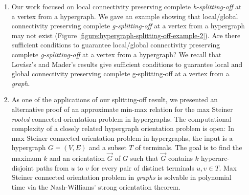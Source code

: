 \begin{enumerate}
    \item Our work focused on local connectivity preserving complete \emph{h-splitting-off} at a vertex from a hypergraph. We gave an example showing that local/global connectivity preserving complete \emph{g-splitting-off} at a vertex from a hypergraph may not exist (Figure \ref{figure:hypergraph-splitting-off-example-2}). 
    Are there sufficient conditions to guarantee local/global connectivity preserving complete \emph{g-splitting-off} at a vertex from a hypergraph? We recall that Lov\'{a}sz's \cite{Lov74, Lovasz-problems-book} and Mader's \cite{Mad78} results give sufficient conditions to guarantee local and global connectivity preserving complete g-splitting-off at a vertex from a \emph{graph}. 

    \item As one of the applications of our splitting-off result, we presented an alternative proof of an approximate min-max relation for the max Steiner \emph{rooted}-connected orientation problem in hypergraphs. The computational complexity of a closely related hypergraph orientation problem is open: In max Steiner connected orientation problem in hypergraphs, the input is a hypergraph $G=(V, E)$ and a subset $T$ of terminals. The goal is to find the maximum $k$ and an orientation $\overrightarrow{G}$ of $G$ such that $\overrightarrow{G}$ contains $k$ hyperarc-disjoint paths from $u$ to $v$ for every pair of distinct terminals $u, v\in T$. Max Steiner connected orientation problem in \emph{graphs} is solvable in polynomial time via the Nash-Williams' strong orientation theorem. 

\end{enumerate}
